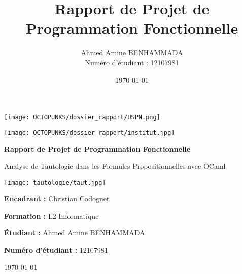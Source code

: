 \documentclass{article}
\title{Rapport de Projet de Programmation Fonctionnelle}
\author{Ahmed Amine BENHAMMADA\\ Numéro d'étudiant : 12107981}
\date{\today}
\begin{document}
\begin{titlepage}
    \centering
    \begin{minipage}[t]{0.45\textwidth}
        \raggedright
        \texttt{[image: OCTOPUNKS/dossier\_rapport/USPN.png]}
    \end{minipage}
    \hfill
    \begin{minipage}[t]{0.45\textwidth}
        \raggedleft
        \texttt{[image: OCTOPUNKS/dossier\_rapport/institut.jpg]}
    \end{minipage}\par\vspace{1cm}
    
    {\Huge\bfseries Rapport de Projet de Programmation Fonctionnelle\par}
    \vspace{0.8cm}
    {\LARGE Analyse de Tautologie dans les Formules Propositionnelles avec OCaml\par}
    \vspace{1.2cm}
    \texttt{[image: tautologie/taut.jpg]}\par\vspace{1.2cm}
    
    \begin{minipage}[t]{0.45\textwidth}
        \raggedright
        \textbf{Encadrant :} Christian Codognet\par
        \textbf{Formation :} L2 Informatique\par
        \textbf{Étudiant :} Ahmed Amine BENHAMMADA\par
        \textbf{Numéro d'étudiant :} 12107981\par
        \vspace{0.7cm}
    \end{minipage}
    
    {\Large \today\par}
\end{titlepage}

\tableofcontents %
\newpage
\end{document}
